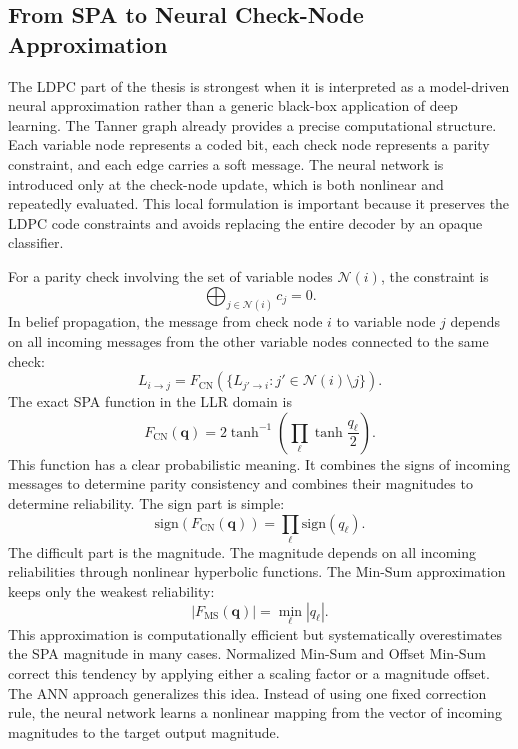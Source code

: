 \subsection{From SPA to Neural Check-Node Approximation}
The LDPC part of the thesis is strongest when it is interpreted as a model-driven neural approximation rather than a generic black-box application of deep learning. The Tanner graph already provides a precise computational structure. Each variable node represents a coded bit, each check node represents a parity constraint, and each edge carries a soft message. The neural network is introduced only at the check-node update, which is both nonlinear and repeatedly evaluated. This local formulation is important because it preserves the LDPC code constraints and avoids replacing the entire decoder by an opaque classifier.

For a parity check involving the set of variable nodes $\mathcal{N}(i)$, the constraint is
\begin{equation}
  \bigoplus_{j\in\mathcal{N}(i)} c_j=0.
\end{equation}
In belief propagation, the message from check node $i$ to variable node $j$ depends on all incoming messages from the other variable nodes connected to the same check:
\begin{equation}
  L_{i\rightarrow j}=F_{\mathrm{CN}}\left(\{L_{j'\rightarrow i}:j'\in\mathcal{N}(i)\setminus j\}\right).
\end{equation}
The exact SPA function in the LLR domain is
\begin{equation}
  F_{\mathrm{CN}}(\mathbf{q})=
  2\tanh^{-1}\left(\prod_{\ell}\tanh\frac{q_\ell}{2}\right).
\end{equation}
This function has a clear probabilistic meaning. It combines the signs of incoming messages to determine parity consistency and combines their magnitudes to determine reliability. The sign part is simple:
\begin{equation}
  \mathrm{sign}\left(F_{\mathrm{CN}}(\mathbf{q})\right)
  =
  \prod_{\ell}\mathrm{sign}(q_\ell).
\end{equation}
The difficult part is the magnitude. The magnitude depends on all incoming reliabilities through nonlinear hyperbolic functions. The Min-Sum approximation keeps only the weakest reliability:
\begin{equation}
  |F_{\mathrm{MS}}(\mathbf{q})|=\min_{\ell}|q_\ell|.
\end{equation}
This approximation is computationally efficient but systematically overestimates the SPA magnitude in many cases. Normalized Min-Sum and Offset Min-Sum correct this tendency by applying either a scaling factor or a magnitude offset. The ANN approach generalizes this idea. Instead of using one fixed correction rule, the neural network learns a nonlinear mapping from the vector of incoming magnitudes to the target output magnitude.

